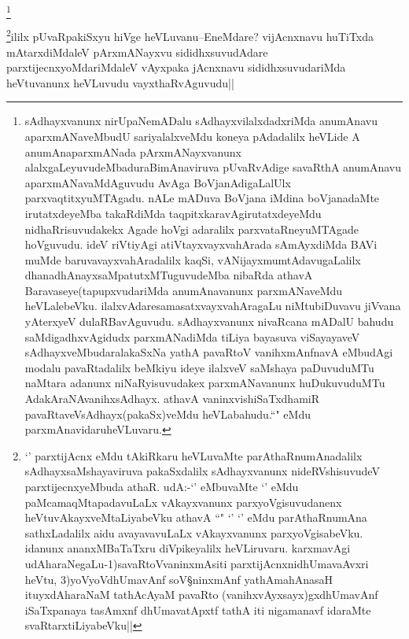 \begin{artha}
\footnote{sAdhayxvanunx nirUpaNemADalu sAdhayxvilalxdadxriMda anumAnavu aparxmANaveMbudU sariyalalxveMdu koneya pAdadalilx heVLide A anumAnaparxmANada pArxmANayxvanunx alalxgaLeyuvudeMbaduraBimAnaviruva pUvaRvAdige savaRthA anumAnavu aparxmANavaMdAguvudu AvAga BoVjanAdigaLalUlx parxvaqtitxyuMTAgadu. nALe mADuva BoVjana iMdina boVjanadaMte irutatxdeyeMba takaRdiMda taqpitxkaravAgirutatxdeyeMdu nidhaRrisuvudakekx Agade hoVgi adaralilx parxvataRneyuMTAgade hoVguvudu. ideV riVtiyAgi atiVtayxvayxvahArada sAmAyxdiMda BAVi muMde baruvavayxvahAradalilx kaqSi, vANijayxmumtAdavugaLalilx dhanadhAnayxsaMpatutxMTuguvudeMba nibaRda athavA Baravaseye(tapupxvudariMda anumAnavanunx parxmANaveMdu heVLalebeVku. ilalxvAdaresamasatxvayxvahAragaLu niMtubiDuvavu jiVvana yAterxyeV dulaRBavAguvudu. sAdhayxvanunx nivaRcana mADalU bahudu saMdigadhxvAgidudx parxmANadiMda tiLiya bayasuva viSayayaveV sAdhayxveMbudaralakaSxNa yathA pavaRtoV vanihxmAnfnavA eMbudAgi modalu pavaRtadalilx beMkiyu ideye ilalxveV saMshaya paDuvuduMTu naMtara adanunx niNaRyisuvudakex parxmANavanunx huDukuvuduMTu AdakAraNAvanihxsAdhayx. athavA vaninxvishiSaTxdhamiR pavaRtaveVsAdhayx(pakaSx)veMdu heVLabahudu.``\stext" eMdu parxmAnavidaruheVLuvaru.}
\end{artha}

\begin{artha}
\footnote{`\stext' parxtijAcnx eMdu tAkiRkaru heVLuvaMte parAthaRnumAnadalilx sAdhayxsaMshayaviruva pakaSxdalilx sAdhayxvanunx nideRVshisuvudeV parxtijecnxyeMbuda athaR. udA:-`\stext' eMbuvaMte `\stext' eMdu paMcamaqMtapadavuLaLx vAkayxvanunx parxyoVgisuvudanenx heVtuvAkayxveMtaLiyabeVku athavA ``\stext" `\stext' `\stext' eMdu parAthaRnumAna sathxLadalilx aidu avayavavuLaLx vAkayxvanunx parxyoVgisabeVku. idanunx ananxMBaTaTxru diVpikeyalilx heVLiruvaru. karxmavAgi udAharaNegaLu-1)savaRtoVvaninxmAsiti parxtijAcnxnidhUmavaAvxri heVtu, 3)yoVyoVdhUmavAnf soV\S ninxmAnf yathAmahAnasaH ituyxdAharaNaM tathAcAyaM pavaRto (vanihxvAyxsayx)gxdhUmavAnf  iSaTxpanaya tasAmxnf dhUmavatApxtf tathA  iti nigamanavf idaraMte svaRtarxtiLiyabeVku||}ililx pUvaRpakiSxyu hiVge heVLuvanu--EneMdare? vijAcnxnavu huTiTxda mAtarxdiMdaleV pArxmANayxvu sididhxsuvudAdare parxtijecnxyoMdariMdaleV vAyxpaka jAcnxnavu sididhxsuvudariMda heVtuvanunx heVLuvudu vayxthaRvAguvudu||
\end{artha}

